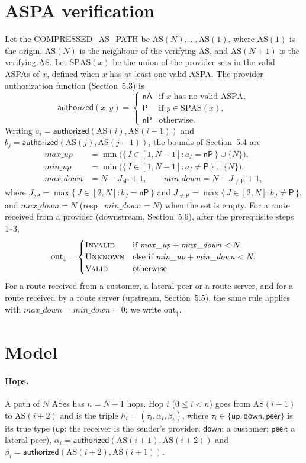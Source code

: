 \documentclass[11pt,a4paper]{article}
\theoremstyle{definition}
\theoremstyle{remark}
\newcommand{\AS}{\mathrm{AS}}
\newcommand{\auth}{\mathsf{authorized}}
\newcommand{\Pp}{\mathsf{P}}      %
\newcommand{\nP}{\mathsf{nP}}     %
\newcommand{\nA}{\mathsf{nA}}     %
\newcommand{\up}{\mathsf{up}}
\newcommand{\down}{\mathsf{down}}
\newcommand{\peer}{\mathsf{peer}}
\newcommand{\Valid}{\textup{\textsc{Valid}}}
\newcommand{\Invalid}{\textup{\textsc{Invalid}}}
\newcommand{\Unknown}{\textup{\textsc{Unknown}}}
\newcommand{\maxup}{\mathit{max\_up}}
\newcommand{\minup}{\mathit{min\_up}}
\newcommand{\maxdown}{\mathit{max\_down}}
\newcommand{\mindown}{\mathit{min\_down}}
\begin{document}
\section{ASPA verification}
\label{sec:aspa-bg}

Let the COMPRESSED\_AS\_PATH be $\AS(N),\dots,\AS(1)$, where $\AS(1)$ is the origin, $\AS(N)$ is the
neighbour of the verifying AS, and $\AS(N+1)$ is the verifying AS. Let $\mathrm{SPAS}(x)$ be the union of
the provider sets in the valid ASPAs of $x$, defined when $x$ has at least one valid ASPA. The provider
authorization function (Section~5.3) is
\[
  \auth(x,y)=
  \begin{cases}
    \nA & \text{if $x$ has no valid ASPA},\\
    \Pp & \text{if } y\in\mathrm{SPAS}(x),\\
    \nP & \text{otherwise}.
  \end{cases}
\]
Writing $a_i=\auth(\AS(i),\AS(i+1))$ and $b_j=\auth(\AS(j),\AS(j-1))$, the bounds of Section~5.4 are
\begin{align*}
  \maxup   &= \min\bigl(\{\, I\in[1,N-1] : a_I=\nP \,\}\cup\{N\}\bigr),\\
  \minup   &= \min\bigl(\{\, I\in[1,N-1] : a_I\neq\Pp \,\}\cup\{N\}\bigr),\\
  \maxdown &= N-J_{\nP}+1,\qquad \mindown = N-J_{\neq\Pp}+1,
\end{align*}
where $J_{\nP}=\max\{\,J\in[2,N] : b_J=\nP\,\}$ and $J_{\neq\Pp}=\max\{\,J\in[2,N] : b_J\neq\Pp\,\}$, and
$\maxdown=N$ (resp.\ $\mindown=N$) when the set is empty.
For a route received from a provider (downstream, Section~5.6), after the prerequisite steps 1--3,
\[
  \mathrm{out}_{\downarrow}=
  \begin{cases}
    \Invalid & \text{if } \maxup+\maxdown<N,\\
    \Unknown & \text{else if } \minup+\mindown<N,\\
    \Valid   & \text{otherwise.}
  \end{cases}
\]
For a route received from a customer, a lateral peer or a route server, and for a route received by a
route server (upstream, Section~5.5), the same rule applies with $\maxdown=\mindown=0$; we write
$\mathrm{out}_{\uparrow}$.

\section{Model}
\label{sec:model}

\paragraph{Hops.}
A path of $N$ ASes has $n=N-1$ hops. Hop $i$ ($0\le i<n$) goes from $\AS(i+1)$ to $\AS(i+2)$ and is the
triple $h_i=(\tau_i,\alpha_i,\beta_i)$, where $\tau_i\in\{\up,\down,\peer\}$ is its true type ($\up$: the
receiver is the sender's provider; $\down$: a customer; $\peer$: a lateral peer),
$\alpha_i=\auth(\AS(i+1),\AS(i+2))$ and $\beta_i=\auth(\AS(i+2),\AS(i+1))$.
\end{document}
